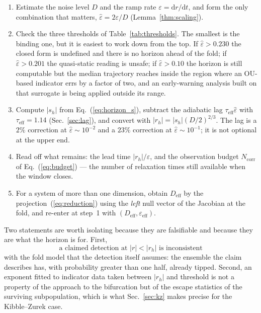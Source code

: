 \documentclass[%
 twocolumn,
 superscriptaddress,
 amsmath,amssymb,
 aps,
 pre,
 floatfix,
]{revtex4-2}
\newcommand{\dd}{\mathrm{d}}
\newcommand{\Sig}{\hat\varepsilon}
\begin{document}
\begin{enumerate}
\itemsep2pt
\item Estimate the noise level $D$ and the ramp rate $\varepsilon=\dd r/\dd t$,
  and form the only combination that matters, $\Sig=2\varepsilon/D$
  (Lemma~\ref{thm:scaling}).

\item Check the three thresholds of Table~\ref{tab:thresholds}.  The smallest
  is the binding one, but it is easiest to work down from the top.  If $\Sig>0.230$ the closed form is undefined and there is no
  horizon ahead of the fold; if $\Sig>0.201$ the quasi-static reading is unsafe;
  if $\Sig>0.10$ the horizon is still computable but the median trajectory
  reaches inside the region where an OU-based indicator errs by a factor of two,
  and an early-warning analysis built on that surrogate is being applied outside
  its range.

\item Compute $|s_h|$ from Eq.~(\ref{eq:horizon_s}), subtract the adiabatic lag
  $\tau_{\mathrm{eff}}\Sig$ with $\tau_{\mathrm{eff}}=1.14$
  (Sec.~\ref{sec:lag}), and convert with $|r_h|=|s_h|(D/2)^{2/3}$.  The lag is a
  $2\%$ correction at $\Sig\sim10^{-2}$ and a $23\%$ correction at
  $\Sig\sim10^{-1}$; it is not optional at the upper end.

\item Read off what remains: the lead time $|r_h|/\varepsilon$, and the
  observation budget $N_{\mathrm{corr}}$ of Eq.~(\ref{eq:budget}) --- the number
  of relaxation times still available when the window closes.

\item For a system of more than one dimension, obtain $D_{\mathrm{eff}}$ by the
  projection~(\ref{eq:reduction}) using the \emph{left} null vector of the
  Jacobian at the fold, and re-enter at step~1 with
  $(D_{\mathrm{eff}},\varepsilon_{\mathrm{eff}})$.
\end{enumerate}

Two statements are worth isolating because they are falsifiable and because they
are what the horizon is for.  First,
\begin{equation}
\label{eq:falsifiable}
\text{a claimed detection at }|r|<|r_h|\text{ is inconsistent}
\end{equation}
with the fold model that the detection itself assumes: the ensemble the claim
describes has, with probability greater than one half, already tipped.  Second,
an exponent fitted to indicator data taken between $|r_h|$ and threshold is not
a property of the approach to the bifurcation but of the escape statistics of
the surviving subpopulation, which is what Sec.~\ref{sec:kz} makes precise for
the Kibble--Zurek case.
\end{document}
